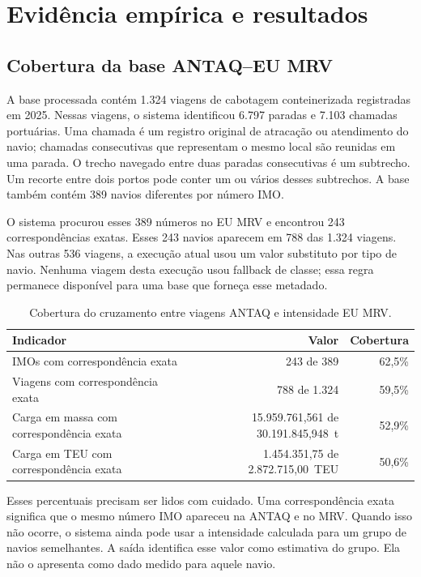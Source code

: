 \documentclass[12pt,a4paper]{article}
\begin{document}
\section{Evidência empírica e resultados}
\label{sec:resultados}

\subsection{Cobertura da base ANTAQ--EU MRV}

A base processada contém 1.324 viagens de cabotagem conteinerizada registradas em 2025. Nessas viagens, o sistema identificou 6.797 paradas e 7.103 chamadas portuárias. Uma chamada é um registro original de atracação ou atendimento do navio; chamadas consecutivas que representam o mesmo local são reunidas em uma parada. O trecho navegado entre duas paradas consecutivas é um subtrecho. Um recorte entre dois portos pode conter um ou vários desses subtrechos. A base também contém 389 navios diferentes por número IMO.

O sistema procurou esses 389 números no EU MRV e encontrou 243 correspondências exatas. Esses 243 navios aparecem em 788 das 1.324 viagens. Nas outras 536 viagens, a execução atual usou um valor substituto por tipo de navio. Nenhuma viagem desta execução usou fallback de classe; essa regra permanece disponível para uma base que forneça esse metadado.

\begin{table}[htbp]
\centering
\footnotesize
\caption{Cobertura do cruzamento entre viagens ANTAQ e intensidade EU MRV.}
\label{tab:cobertura-mrv}
\begin{tabular}{lrr}
\toprule
Indicador & Valor & Cobertura \tabularnewline
\midrule
IMOs com correspondência exata & 243 de 389 & 62,5\% \tabularnewline
Viagens com correspondência exata & 788 de 1.324 & 59,5\% \tabularnewline
Carga em massa com correspondência exata & 15.959.761,561 de 30.191.845,948~t & 52,9\% \tabularnewline
Carga em TEU com correspondência exata & 1.454.351,75 de 2.872.715,00~TEU & 50,6\% \tabularnewline
\bottomrule
\end{tabular}
\end{table}

Esses percentuais precisam ser lidos com cuidado. Uma correspondência exata significa que o mesmo número IMO apareceu na ANTAQ e no MRV. Quando isso não ocorre, o sistema ainda pode usar a intensidade calculada para um grupo de navios semelhantes. A saída identifica esse valor como estimativa do grupo. Ela não o apresenta como dado medido para aquele navio.
\end{document}
